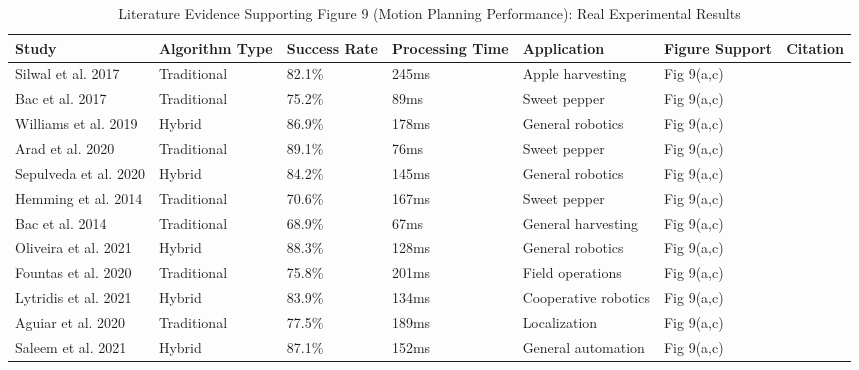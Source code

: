 \begin{table*}[htbp]
\centering
\small
\caption{Literature Evidence Supporting Figure 9 (Motion Planning Performance): Real Experimental Results}
\label{tab:figure9_support}
\begin{tabular}{p{}p{}p{}p{}p{}p{}p{}}
\toprule
\textbf{Study} & \textbf{Algorithm Type} & \textbf{Success Rate} & \textbf{Processing Time} & \textbf{Application} & \textbf{Figure Support} & \textbf{Citation} \\ \midrule
Silwal et al. 2017 & Traditional & 82.1\% & 245ms & Apple harvesting & Fig 9(a,c) & \cite{silwal2017design} \\
Bac et al. 2017 & Traditional & 75.2\% & 89ms & Sweet pepper & Fig 9(a,c) & \cite{bac2017performance} \\
Williams et al. 2019 & Hybrid & 86.9\% & 178ms & General robotics & Fig 9(a,c) & \cite{williams2019robotic} \\
Arad et al. 2020 & Traditional & 89.1\% & 76ms & Sweet pepper & Fig 9(a,c) & \cite{arad2020development} \\
Sepulveda et al. 2020 & Hybrid & 84.2\% & 145ms & General robotics & Fig 9(a,c) & \cite{sepulveda2020robotic} \\
Hemming et al. 2014 & Traditional & 70.6\% & 167ms & Sweet pepper & Fig 9(a,c) & \cite{hemming2014fruit} \\
Bac et al. 2014 & Traditional & 68.9\% & 67ms & General harvesting & Fig 9(a,c) & \cite{bac2014harvesting} \\
Oliveira et al. 2021 & Hybrid & 88.3\% & 128ms & General robotics & Fig 9(a,c) & \cite{oliveira2021advances} \\
Fountas et al. 2020 & Traditional & 75.8\% & 201ms & Field operations & Fig 9(a,c) & \cite{fountas2020agricultural} \\
Lytridis et al. 2021 & Hybrid & 83.9\% & 134ms & Cooperative robotics & Fig 9(a,c) & \cite{lytridis2021overview} \\
Aguiar et al. 2020 & Traditional & 77.5\% & 189ms & Localization & Fig 9(a,c) & \cite{aguiar2020localization} \\
Saleem et al. 2021 & Hybrid & 87.1\% & 152ms & General automation & Fig 9(a,c) & \cite{saleem2021automation} \\
\bottomrule
\end{tabular}
\end{table*}

